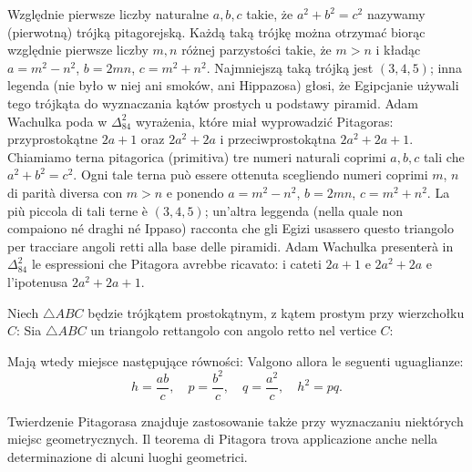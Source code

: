 Względnie pierwsze liczby naturalne $a, b, c$ takie, że $a^2 + b^2 = c^2$ nazywamy (pierwotną) trójką pitagorejską. %
Każdą taką trójkę można otrzymać biorąc względnie pierwsze liczby $m, n$ różnej parzystości takie, że $m > n$ i kładąc $a = m^2 - n^2$, $b = 2 mn$, $c = m^2 + n^2$. %
Najmniejszą taką trójką jest $(3, 4, 5)$; inna legenda (nie było w niej ani smoków, ani Hippazosa) głosi, że Egipcjanie używali tego trójkąta do wyznaczania kątów prostych u podstawy piramid. %
Adam Wachulka poda w $\Delta_{84}^{2}$ wyrażenia, które miał wyprowadzić Pitagoras: przyprostokątne $2a+1$ oraz $2a^2+2a$ i przeciwprostokątna $2a^2+2a+1$. %
Chiamiamo terna pitagorica (primitiva) tre numeri naturali coprimi $a,b,c$ tali che $a^2+b^2=c^2$. %
Ogni tale terna può essere ottenuta scegliendo numeri coprimi $m$, $n$ di parità diversa con $m>n$ e ponendo $a=m^2-n^2$, $b=2mn$, $c=m^2+n^2$. %
La più piccola di tali terne è $(3,4,5)$; un'altra leggenda (nella quale non compaiono né draghi né Ippaso) racconta che gli Egizi usassero questo triangolo per tracciare angoli retti alla base delle piramidi. %
Adam Wachulka presenterà in $\Delta_{84}^{2}$ le espressioni che Pitagora avrebbe ricavato: i cateti $2a+1$ e $2a^2+2a$ e l'ipotenusa $2a^2+2a+1$. %

\begin{proposition}
    Niech $\triangle ABC$ będzie trójkątem prostokątnym, z kątem prostym przy wierzchołku $C$: %
    Sia $\triangle ABC$ un triangolo rettangolo con angolo retto nel vertice $C$: %
    \begin{center}

    \end{center}
    Mają wtedy miejsce następujące równości: %
    Valgono allora le seguenti uguaglianze: %
    \begin{equation}
        h = \frac{ab}{c}, \quad
        p = \frac{b^2}{c}, \quad
        q = \frac{a^2}{c}, \quad
        h^2 = pq.
    \end{equation}
\end{proposition}

Twierdzenie Pitagorasa znajduje zastosowanie także przy wyznaczaniu niektórych miejsc geometrycznych. %
Il teorema di Pitagora trova applicazione anche nella determinazione di alcuni luoghi geometrici. %

